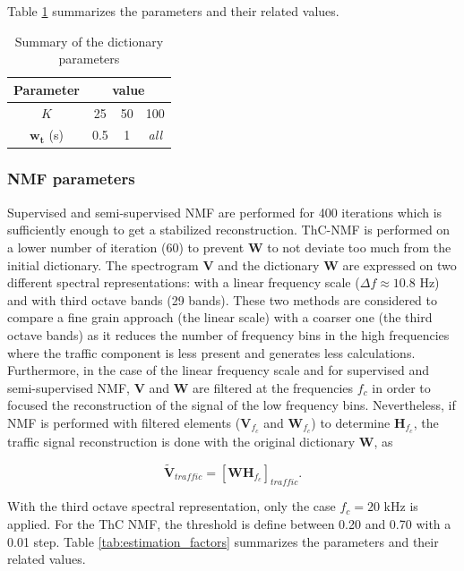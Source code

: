 \documentclass[twocolumn,a4paper,10pt]{article}
\begin{document}
Table \ref{tab:dictionary_factors} summarizes the parameters and their related values.

\begin{table}[h]
\centering
\begin{tabular}{cccc}
Parameter &  \multicolumn{3}{c}{value}\\ \hline
$K$ & 25  & 50 & 100 \\ \hline
$\mathbf{w_t}$ (s)& 0.5 & 1  & \textit{all}
\end{tabular}
\caption{Summary of the dictionary parameters}
\label{tab:dictionary_factors}
\end{table} 

\subsubsection{NMF parameters}

Supervised and semi-supervised NMF are performed for 400 iterations which is sufficiently enough to get a stabilized reconstruction. ThC-NMF is performed on a lower number of iteration (60) to prevent $\mathbf{W}$ to not deviate too much from the initial dictionary. The spectrogram $\mathbf{V}$ and the dictionary $\mathbf{W}$ are expressed on two different spectral representations: with a linear frequency scale ($\Delta f \approx 10.8$ Hz) and with third octave bands (29 bands). These two methods are considered to compare a fine grain approach (the linear scale) with a coarser one (the third octave bands) as it reduces the number of frequency bins in the high frequencies where the traffic component is less present and generates less calculations. Furthermore, in the case of the linear frequency scale and for supervised and semi-supervised NMF, $\mathbf{V}$ and $\mathbf{W}$ are filtered at the frequencies $f_c$ in order to focused the reconstruction of the signal of the low frequency bins. Nevertheless, if NMF is performed with filtered elements ($\mathbf{V}_{f_c}$ and $\mathbf{W}_{f_c}$) to determine $\mathbf{H}_{f_c}$, the traffic signal reconstruction is done with the original dictionary $\mathbf{W}$, as

\begin{equation}
\mathbf{\tilde{V}}_{traffic} = \left[\mathbf{WH}_{f_c}\right]_{traffic}.
\end{equation}

With the third octave spectral representation, only the case $f_c = 20$ kHz is applied. For the ThC NMF, the threshold is define between 0.20 and 0.70 with a 0.01 step. Table \ref{tab:estimation_factors} summarizes the parameters and their related values.
\end{document}
